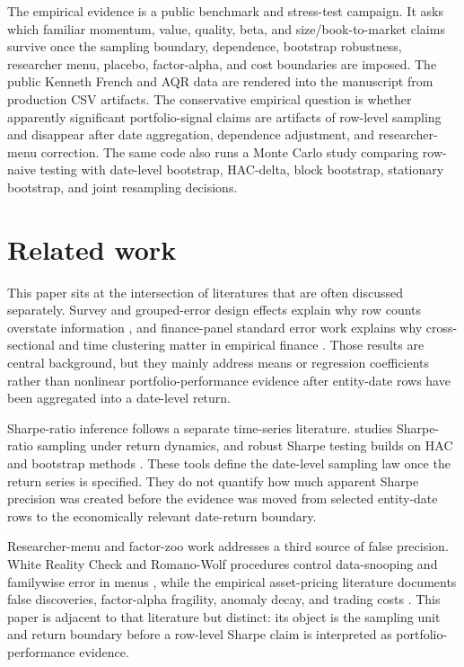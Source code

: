 \documentclass[12pt,a4paper]{article}
\begin{document}
The empirical evidence is a public benchmark and stress-test campaign.
It asks
which familiar momentum, value, quality, beta, and size/book-to-market
claims survive once the sampling boundary, dependence, bootstrap
robustness, researcher menu, placebo, factor-alpha, and cost boundaries
are imposed.  The public Kenneth French and AQR data are rendered into
the manuscript from
production CSV artifacts.
The conservative empirical question is whether apparently significant
portfolio-signal claims are artifacts of row-level sampling and
disappear after date aggregation, dependence adjustment, and
researcher-menu correction.
The same code also runs a Monte Carlo study comparing row-naive testing
with date-level bootstrap, HAC-delta, block bootstrap, stationary
bootstrap, and joint resampling decisions.

\section{Related work}

This paper sits at the intersection of literatures that are often
discussed separately.  Survey and grouped-error design effects explain
why row counts overstate information
\citep{kish1965survey,moulton1986random}, and finance-panel standard
error work explains why cross-sectional and time clustering matter in
empirical finance \citep{petersen2009estimating}.  Those results are
central background, but they mainly address means or regression
coefficients rather than nonlinear portfolio-performance evidence after
entity-date rows have been aggregated into a date-level return.

Sharpe-ratio inference follows a separate time-series literature.
\citet{lo2002statistics} studies Sharpe-ratio sampling under return
dynamics, and robust Sharpe testing builds on HAC and bootstrap methods
\citep{ledoit2008robust,opdyke2007comparing,andrews1991heteroskedasticity,kiefer2005new,kunsch1989jackknife,politis1994stationary,lahiri2003resampling}.
These tools define the date-level sampling law once the return series is
specified.  They do not quantify how much apparent Sharpe precision was
created before the evidence was moved from selected entity-date rows to
the economically relevant date-return boundary.

Researcher-menu and factor-zoo work addresses a third source of false
precision.  White Reality Check and Romano-Wolf procedures control
data-snooping and familywise error in menus
\citep{white2000reality,romano2005stepwise}, while the empirical
asset-pricing literature documents false discoveries, factor-alpha
fragility, anomaly decay, and trading costs
\citep{harvey2016and,harvey2020false,harvey2020census,bailey2014deflated,holm1979simple,fama1993common,carhart1997persistence,fama2010luck,mclean2016does,almgren2001optimal,hasbrouck2009trading,frazzini2015trading}.
This paper is adjacent to that literature but distinct: its object is
the sampling unit and return boundary before a row-level Sharpe claim is
interpreted as portfolio-performance evidence.
\end{document}
